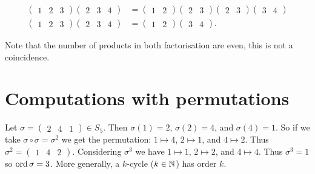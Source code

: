 \begin{solution}
    \begin{align*}
        \begin{pmatrix}
            1 & 2 & 3
        \end{pmatrix}
        \begin{pmatrix}
            2 & 3 & 4
        \end{pmatrix}
        &=
        \begin{pmatrix}
            1 & 2
        \end{pmatrix}
        \begin{pmatrix}
            2 & 3
        \end{pmatrix}
        \begin{pmatrix}
            2 & 3
        \end{pmatrix}
        \begin{pmatrix}
            3 & 4
        \end{pmatrix}
        \\
        \begin{pmatrix}
            1 & 2 & 3
        \end{pmatrix}
        \begin{pmatrix}
            2 & 3 & 4
        \end{pmatrix}
        &=
        \begin{pmatrix}
            1 & 2
        \end{pmatrix}
        \begin{pmatrix}
            3 & 4
        \end{pmatrix}
        .
    \end{align*}
\end{solution}

Note that the number of products in both factorisation are
even, this is not a coincidence.

\section{Computations with permutations}

\begin{example}
    Let 
    $
        \sigma =
        \begin{pmatrix}
            2 & 4 & 1
        \end{pmatrix}
        \in S_5
    $.
    Then $\sigma(1) = 2$, $\sigma(2) = 4$, and $\sigma(4) = 1$.
    So if we take $\sigma \circ \sigma = \sigma^2$ we get the
    permutation: 
    $1 \mapsto 4$, $2 \mapsto 1$, and $4 \mapsto 2$.
    Thus 
    $
        \sigma^2 =
        \begin{pmatrix}
            1 & 4 & 2
        \end{pmatrix}
    $.
    Considering $\sigma^3$ we have
    $1 \mapsto 1$, $2 \mapsto 2$, and $4 \mapsto 4$.
    Thus $\sigma^3 = 1$ so $\operatorname{ord}\sigma = 3$.
    More generally, a $k$-cycle ($k \in \mathbb{N}$) has order $k$.
\end{example}

